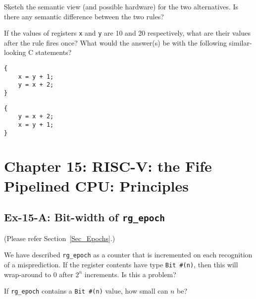 Sketch the semantic view (and possible hardware) for the two
alternatives.  Is there any semantic difference between the two rules?

If the values of registers \verb|x| and \verb|y| are 10 and 20
respectively, what are their values after the rule fires once?  What
would the answer(s) be with the following similar-looking C
statements?

\begin{center}
\begin{minipage}{0.4\textwidth}
 {\footnotesize
 \begin{Verbatim}[frame=single, label=C/C++]
{
    x = y + 1;
    y = x + 2;
}
 \end{Verbatim}
 }
\end{minipage}
\hmm
\begin{minipage}{0.4\textwidth}
 {\footnotesize
 \begin{Verbatim}[frame=single, label=C/C++]
{
    y = x + 2;
    x = y + 1;
}
 \end{Verbatim}
 }
\end{minipage}
\end{center}


\hdivider

\section*{Chapter 15: RISC-V: the Fife Pipelined CPU: Principles}


\subsection*{Ex-15-A: Bit-width of {\tt rg\_epoch}}
\label{Ex-15-A-Epoch-Bitwidth}

(Please refer Section~\ref{Sec_Epochs}.)

We have described \verb|rg_epoch| as a counter that is incremented on
each recognition of a misprediction.  If the register contents have
type \verb|Bit #(n)|, then this will wrap-around to 0 after $2^n$
increments.  Is this a problem?

If \verb|rg_epoch| contains a \verb|Bit #(n)| value, how small can $n$ be?


